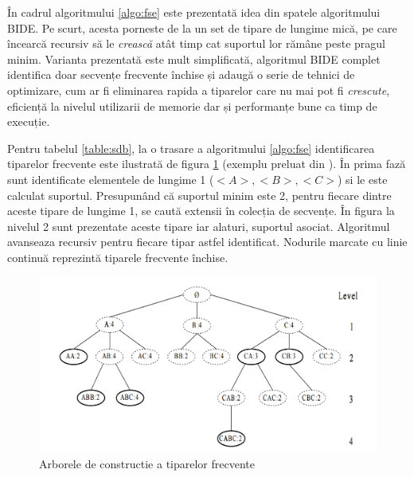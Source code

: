 În cadrul algoritmului \ref{algo:fse} este prezentată idea din spatele algoritmului BIDE. Pe scurt, acesta porneste de la un set de tipare de lungime mică, pe care încearcă recursiv să le \textit{crească} atât timp cat suportul lor rămâne peste pragul minim. Varianta prezentată este mult simplificată, algoritmul BIDE complet identifica doar secvențe frecvente închise și adaugă o serie de tehnici de optimizare, cum ar fi eliminarea rapida a tiparelor care nu mai pot fi \textit{crescute}, eficiență la nivelul utilizarii de memorie dar și performanțe bune ca timp de execuție.

\begin{ex}
Pentru tabelul \ref{table:sdb}, la o trasare a algoritmului \ref{algo:fse} identificarea tiparelor frecvente este ilustrată de figura \ref{fig:bide-algo} (exemplu preluat din \cite{bib:wang2004bide}). În prima fază sunt identificate elementele de lungime 1 ($<A>,<B>,<C>$) si le este calculat suportul. Presupunând că suportul minim este 2, pentru fiecare dintre aceste tipare de lungime 1, se caută extensii în colecția de secvențe. În figura la nivelul 2 sunt prezentate aceste tipare iar alaturi, suportul asociat. Algoritmul avanseaza recursiv pentru fiecare tipar astfel identificat. Nodurile marcate cu linie continuă reprezintă tiparele frecvente închise. 
\end{ex}

\begin{figure}[h]
    \centering
    \includegraphics[width=\textwidth]{figures/bide-tree.png}
    \caption{Arborele de constructie a tiparelor frecvente}
    \label{fig:bide-algo}
\end{figure}
